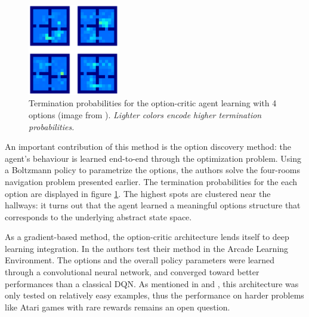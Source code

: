 \documentclass{article}
\begin{document}
\begin{figure}
    \centering
    \includegraphics[width=4cm]{images/option-critic-4room.png}
    \caption{Termination probabilities for the option-critic
agent learning with 4 options (image from \cite{bacon_option-critic_2016}). \small \it Lighter colors encode higher termination probabilities.}
    \label{fig:opt-crit}
    \vspace{-1cm}
\end{figure}

An important contribution of this method is the option discovery method: the agent's behaviour is learned end-to-end through the optimization problem. Using a Boltzmann policy to parametrize the options, the authors solve the four-rooms navigation problem presented earlier. The termination probabilities for the each option are displayed in figure \ref{fig:opt-crit}. The highest spots are clustered near the hallways: it turns out that the agent learned a meaningful options structure that corresponds to the underlying abstract state space.

As a gradient-based method, the option-critic architecture lends itself to deep learning integration. In \cite{bacon_option-critic_2016} the authors test their method in the Arcade Learning Environment. The options and the overall policy parameters were learned through a convolutional neural network, and converged toward better performances than a classical DQN.
As mentioned in \cite{alexander_strategic_2016} and \cite{vezhnevets_feudal_2017}, this architecture was only tested on relatively easy examples, thus the performance on harder problems like Atari games with rare rewards remains an open question.

\end{document}
